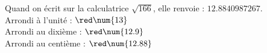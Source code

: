     Quand on écrit sur la calculatrice $\sqrt{166}$, elle renvoie : $\num{12.8840987267}$.\\
        Arrondi à l'unité :   ${\red \num{13}}$\\
        Arrondi au dixième :  ${\red \num{12.9}}$\\
        Arrondi au centième : ${\red \num{12.88}}$
